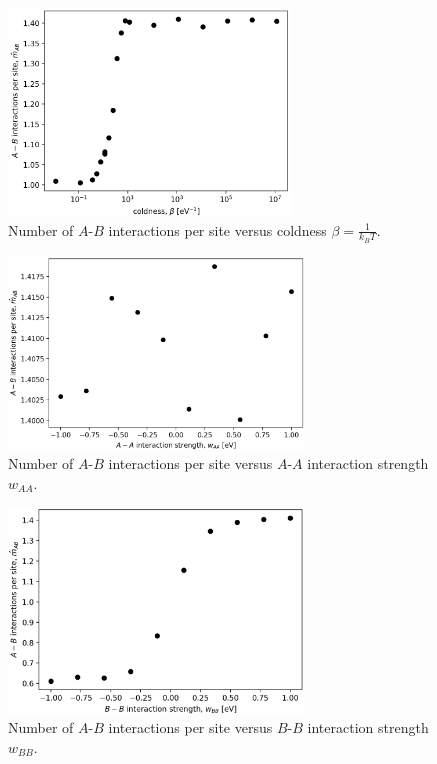\documentclass[10pt]{article}
\begin{document}
\begin{figure}[h!]
\centering
\includegraphics[width=0.67\textwidth]{Figures/m_AB_hat_versus_beta.png}
\caption{Number of $A$-$B$ interactions per site versus coldness $\beta = \frac{1}{k_B T}$.}
\label{fig:m_AB_hat_versus_beta}
\end{figure}

\begin{figure}[h!]
\centering
\includegraphics[width=0.70\textwidth]{Figures/m_AB_hat_versus_w_AA.png}
\caption{Number of $A$-$B$ interactions per site versus $A$-$A$ interaction strength $w_{AA}$.}
\label{fig:m_AB_hat_versus_w_AA}
\end{figure}

\begin{figure}[h!]
\centering
\includegraphics[width=0.70\textwidth]{Figures/m_AB_hat_versus_w_BB.png}
\caption{Number of $A$-$B$ interactions per site versus $B$-$B$ interaction strength $w_{BB}$.}
\label{fig:m_AB_hat_versus_w_BB}
\end{figure}
\end{document}

